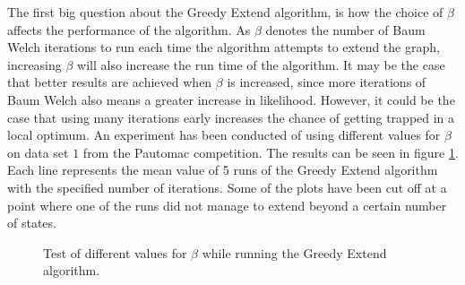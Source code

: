 The first big question about the Greedy Extend algorithm, is how the choice of $\beta$ affects the performance of the algorithm.
As $\beta$ denotes the number of Baum Welch iterations to run each time the algorithm attempts to extend the graph, increasing $\beta$ will also increase the run time of the algorithm. It may be the case that better results are achieved when $\beta$ is increased, since more iterations of Baum Welch also means a greater increase in likelihood. However, it could be the case that using many iterations early increases the chance of getting trapped in a local optimum.
An experiment has been conducted of using different values for $\beta$ on data set $1$ from the Pautomac competition. The results can be seen in figure \ref{fig:ge-different-thresholds-tested}. Each line represents the mean value of 5 runs of the Greedy Extend algorithm with the specified number of iterations. Some of the plots have been cut off at a point where one of the runs did not manage to extend beyond a certain number of states.

\begin{figure}
\begin{centering}
\caption{Test of different values for $\beta$ while running the Greedy Extend algorithm.}
\label{fig:ge-different-thresholds-tested} 
\end{centering}
\end{figure}

